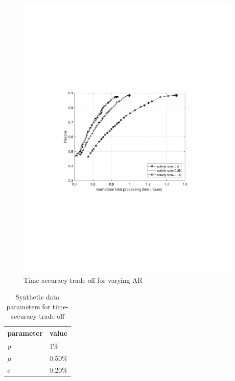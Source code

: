 \begin{figure}
    \centering
    \includegraphics[width=\linewidth,trim={100 240 100 250},clip]{images/time-acc-tradeoff-ar-mog}
    \caption{Time-accuracy trade off for varying AR}
    \label{fig:time-acc-tradeoff-ar-mog}
\end{figure}

\begin{table}
\centering
\caption{Synthetic data parameters for time-accuracy trade off} \vspace{5pt}
\label{table:fig1_data_params}
\begin{tabular}{|l|l|}
\hline
parameter             & value  \\ \hline \hline
p                     & 1\%    \\ \hline
$\mu$    & 0.50\% \\ \hline
$\sigma$ & 0.20\% \\ \hline
\end{tabular}
\end{table}

